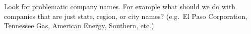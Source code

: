 \documentclass[]{article}
\newenvironment{Shaded}{\begin{snugshade}}{\end{snugshade}}
\newcommand{\KeywordTok}[1]{\textcolor[rgb]{0.13,0.29,0.53}{\textbf{#1}}}
\newcommand{\DataTypeTok}[1]{\textcolor[rgb]{0.13,0.29,0.53}{#1}}
\newcommand{\StringTok}[1]{\textcolor[rgb]{0.31,0.60,0.02}{#1}}
\newcommand{\CommentTok}[1]{\textcolor[rgb]{0.56,0.35,0.01}{\textit{#1}}}
\newcommand{\OperatorTok}[1]{\textcolor[rgb]{0.81,0.36,0.00}{\textbf{#1}}}
\newcommand{\NormalTok}[1]{#1}
\begin{document}
\begin{Shaded}
\end{Shaded}

Look for problematic company names. For example what should we do with
companies that are just state, region, or city names? (e.g.~El Paso
Corporation, Tennessee Gas, American Energy, Southern, etc.)
\end{document}
